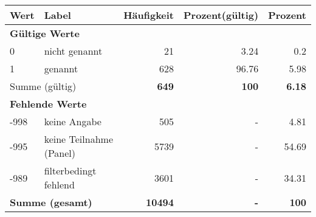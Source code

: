      \begin{longtable}{lXrrr}
     \toprule
     \textbf{Wert} & \textbf{Label} & \textbf{Häufigkeit} & \textbf{Prozent(gültig)} & \textbf{Prozent} \\
     \endhead
     \midrule
     \multicolumn{5}{l}{\textbf{Gültige Werte}}\\

     0 &
     \multicolumn{1}{X}{ nicht genannt   } &


       \num{21} &
       \num[round-mode=places,round-precision=2]{3.24} &
         \num[round-mode=places,round-precision=2]{0.2} \\

     1 &
     \multicolumn{1}{X}{ genannt   } &


       \num{628} &
       \num[round-mode=places,round-precision=2]{96.76} &
         \num[round-mode=places,round-precision=2]{5.98} \\
     \midrule
     \multicolumn{2}{l}{Summe (gültig)} &
       \textbf{\num{649}} &
     \textbf{\num{100}} &
       \textbf{\num[round-mode=places,round-precision=2]{6.18}} \\
     \multicolumn{5}{l}{\textbf{Fehlende Werte}}\\
       -998 &
       keine Angabe &
         \num{505} &
        - &
         \num[round-mode=places,round-precision=2]{4.81} \\
       -995 &
       keine Teilnahme (Panel) &
         \num{5739} &
        - &
         \num[round-mode=places,round-precision=2]{54.69} \\
       -989 &
       filterbedingt fehlend &
         \num{3601} &
        - &
         \num[round-mode=places,round-precision=2]{34.31} \\
     \midrule
     \multicolumn{2}{l}{\textbf{Summe (gesamt)}} &
          \textbf{\num{10494}} &
        \textbf{-} &
        \textbf{\num{100}} \\
     \bottomrule
     \end{longtable}
     
